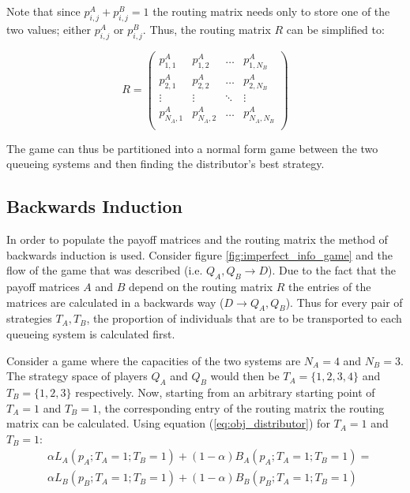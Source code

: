 Note that since \(p_{i,j}^A + p_{i,j}^B = 1\) the routing matrix needs only to
store one of the two values; either \(p_{i,j}^A\) or \(p_{i,j}^B\).
Thus, the routing matrix \(R\) can be simplified to:

\begin{equation}\label{eq:routing_matrix_simplified}
    R = 
    \begin{pmatrix}
        p_{1,1}^A & p_{1,2}^A & \dots & p_{1,N_B}^A \\
        p_{2,1}^A & p_{2,2}^A & \dots & p_{2,N_B}^A \\
        \vdots & \vdots & \ddots & \vdots \\
        p_{N_A,1}^A & p_{N_A,2}^A & \dots & p_{N_A,N_B}^A \\
    \end{pmatrix}
\end{equation}

The game can thus be partitioned into a normal form game between the
two queueing systems and then finding the distributor's best strategy. 

\subsection{Backwards Induction}

In order to populate the payoff matrices and the routing matrix the method
of backwards induction is used.
Consider figure \ref{fig:imperfect_info_game} and the flow of the game that was
described (i.e. \(Q_A, Q_B \rightarrow D\)).
Due to the fact that the payoff matrices \(A\) and \(B\) depend on the routing 
matrix \(R\) the entries of the matrices are calculated in a backwards way 
(\(D \rightarrow Q_A, Q_B\)). 
Thus for every pair of strategies \(T_A, T_B\), the proportion of individuals 
that are to be transported to each queueing system is calculated first. 

Consider a game where the capacities of the two systems are \(N_A = 4\) and 
\(N_B = 3\).
The strategy space of players \(Q_A\) and \(Q_B\) would then be 
\(T_A = \{1, 2, 3, 4\}\) and \(T_B = \{1, 2, 3\}\) respectively.
Now, starting from an arbitrary starting point of \(T_A=1\) and \(T_B=1\), the
corresponding entry of the routing matrix the routing matrix can be calculated.
Using equation (\ref{eq:obj_distributor}) for \(T_A=1\) and \(T_B=1\):
\begin{align}
    & \alpha L_A(p_A;T_A=1;T_B=1) + (1 - \alpha) B_A(p_A;T_A=1;T_B=1) = 
    \nonumber \\
    & \alpha L_B(p_B;T_A=1;T_B=1) + (1 - \alpha) B_B(p_B;T_A=1;T_B=1) 
    \label{eq:obj_distributor_1_1}
\end{align}

